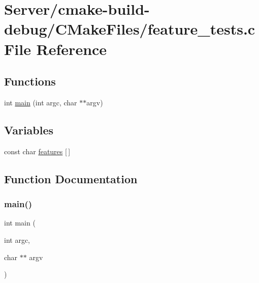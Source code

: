 \hypertarget{Server_2cmake-build-debug_2CMakeFiles_2feature__tests_8c}{}\section{Server/cmake-\/build-\/debug/\+C\+Make\+Files/feature\+\_\+tests.c File Reference}
\label{Server_2cmake-build-debug_2CMakeFiles_2feature__tests_8c}
\subsection*{Functions}
\begin{DoxyCompactItemize}
\item 
int \mbox{\hyperlink{Server_2cmake-build-debug_2CMakeFiles_2feature__tests_8c_a3c04138a5bfe5d72780bb7e82a18e627}{main}} (int argc, char $\ast$$\ast$argv)
\end{DoxyCompactItemize}
\subsection*{Variables}
\begin{DoxyCompactItemize}
\item 
const char \mbox{\hyperlink{Server_2cmake-build-debug_2CMakeFiles_2feature__tests_8c_a1582568e32f689337602a16bf8a5bff0}{features}} \mbox{[}$\,$\mbox{]}
\end{DoxyCompactItemize}


\subsection{Function Documentation}
\mbox{\label{Server_2cmake-build-debug_2CMakeFiles_2feature__tests_8c_a3c04138a5bfe5d72780bb7e82a18e627}} 
\subsubsection{\texorpdfstring{main()}{main()}}
{\footnotesize\ttfamily int main (\begin{DoxyParamCaption}\item[{int}]{argc,  }\item[{char $\ast$$\ast$}]{argv }\end{DoxyParamCaption})}



